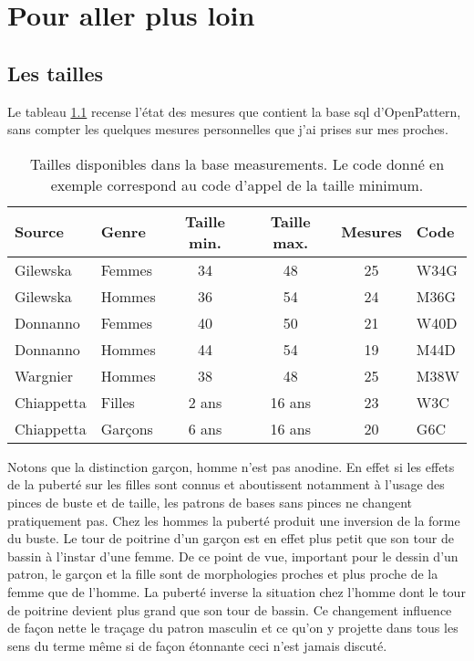\documentclass[10pt,a4paper,twoside]{report}
\begin{document}
\chapter{Pour aller plus loin}

\section{Les tailles}
\label{par:tailles}
Le tableau \ref{tab:meas_sum} recense l'état des mesures que contient la base sql d'OpenPattern, sans compter les quelques mesures personnelles que j'ai prises sur mes proches.

\begin{table}[htb]
\begin{center}
\begin{tabular}{llcccl} \hline
Source & Genre & Taille min. & Taille max. & Mesures & Code\\ \hline
Gilewska & Femmes & 34 & 48 & 25 &  W34G\\
Gilewska & Hommes & 36 & 54 & 24 & M36G\\
Donnanno & Femmes & 40 & 50 & 21 & W40D\\
Donnanno & Hommes & 44 & 54 & 19 & M44D\\
Wargnier & Hommes & 38 & 48 & 25 & M38W\\
Chiappetta & Filles & 2 ans & 16 ans &23& W3C\\
Chiappetta & Garçons & 6 ans & 16 ans &20& G6C\\ \hline
\end{tabular}
\end{center}
\label{tab:meas_sum}
\caption{Tailles disponibles dans la base measurements. Le code donné en exemple correspond au code d'appel de la taille minimum.}
\end{table}

Notons que la distinction garçon, homme n'est pas anodine. En effet si les effets de la puberté sur les filles sont connus et aboutissent notamment à l'usage  des pinces de buste et de taille, les patrons de bases sans pinces ne changent pratiquement pas. Chez les hommes la puberté produit une inversion de la forme du buste. Le tour de poitrine d'un garçon est en effet plus petit que  son tour de bassin à l'instar d'une femme. De ce point de vue, important pour le dessin d'un patron, le garçon et la fille sont de morphologies proches et plus proche de la femme que de l'homme. La puberté inverse la situation chez l'homme dont le tour de poitrine devient plus grand que son tour de bassin. Ce changement influence de façon nette le traçage du patron masculin et ce qu'on y projette dans tous les sens du terme même si de façon étonnante ceci n'est jamais discuté.
\end{document}
